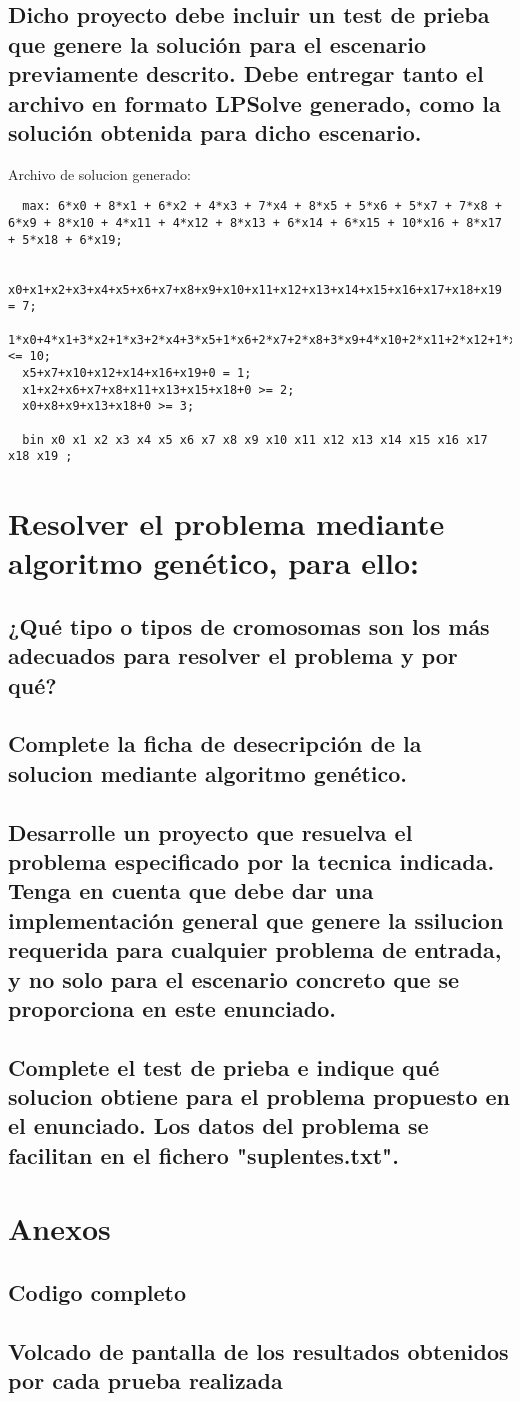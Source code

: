 \documentclass[a4paper,11pt]{article}
\begin{document}
\subsection{Dicho proyecto debe incluir un test de prieba que genere la solución para el escenario previamente descrito. Debe entregar tanto el archivo en formato LPSolve generado, como la solución obtenida para dicho escenario.}

Archivo de solucion generado:
\begin{verbatim}
  max: 6*x0 + 8*x1 + 6*x2 + 4*x3 + 7*x4 + 8*x5 + 5*x6 + 5*x7 + 7*x8 + 6*x9 + 8*x10 + 4*x11 + 4*x12 + 8*x13 + 6*x14 + 6*x15 + 10*x16 + 8*x17 + 5*x18 + 6*x19;

  x0+x1+x2+x3+x4+x5+x6+x7+x8+x9+x10+x11+x12+x13+x14+x15+x16+x17+x18+x19 = 7;
  1*x0+4*x1+3*x2+1*x3+2*x4+3*x5+1*x6+2*x7+2*x8+3*x9+4*x10+2*x11+2*x12+1*x13+3*x14+4*x15+5*x16+1*x17+2*x18+3*x19 <= 10;
  x5+x7+x10+x12+x14+x16+x19+0 = 1;
  x1+x2+x6+x7+x8+x11+x13+x15+x18+0 >= 2;
  x0+x8+x9+x13+x18+0 >= 3;

  bin x0 x1 x2 x3 x4 x5 x6 x7 x8 x9 x10 x11 x12 x13 x14 x15 x16 x17 x18 x19 ;
\end{verbatim}


\section{Resolver el problema mediante algoritmo genético, para ello:}
\subsection{¿Qué tipo o tipos de cromosomas son los más adecuados para resolver el problema y por qué?}

\subsection{Complete la ficha de desecripción de la solucion mediante algoritmo genético.}

\subsection{Desarrolle un proyecto que resuelva el problema especificado por la tecnica indicada. Tenga en cuenta que debe dar una implementación general que genere la ssilucion requerida para cualquier problema de entrada, y no solo para el escenario concreto que se proporciona en este enunciado.}

\subsection{Complete el test de prieba e indique qué solucion obtiene para el problema propuesto en el enunciado. Los datos del problema se facilitan en el fichero "suplentes.txt".}

\section{Anexos}
\subsection{Codigo completo}
\subsection{Volcado de pantalla de los resultados obtenidos por cada prueba realizada}
\end{document}
